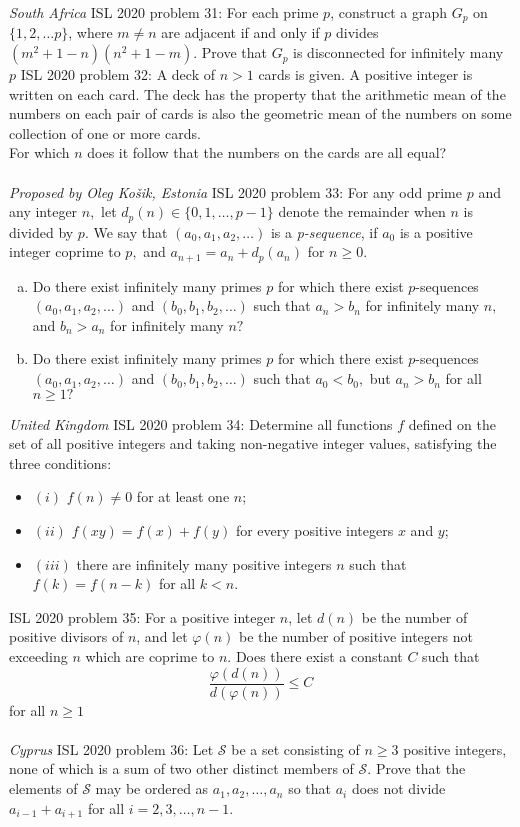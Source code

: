 \textit{South Africa } 
ISL 2020 problem 31:  For each prime $p$, construct a graph $G_p$ on $\{1,2,\ldots p\}$, where $m\neq n$ are adjacent if and only if $p$ divides $(m^2 + 1-n)(n^2 + 1-m)$. Prove that $G_p$ is disconnected for infinitely many $p$ 
ISL 2020 problem 32:  A deck of $n > 1$ cards is given. A positive integer is written on each card. The deck has the property that the arithmetic mean of the numbers on each pair of cards is also the geometric mean of the numbers on some collection of one or more cards. \\
For which $n$ does it follow that the numbers on the cards are all equal? \\\\
\textit{Proposed by Oleg Košik, Estonia} 
ISL 2020 problem 33:  For any odd prime $p$ and any integer $n,$ let $d_p (n) \in \{ 0,1, \dots, p-1 \}$ denote the remainder when $n$ is divided by $p.$ We say that $(a_0, a_1, a_2, \dots)$ is a \textit{p-sequence}, if $a_0$ is a positive integer coprime to $p,$ and $a_{n+1} =a_n + d_p (a_n)$ for $n \geqslant 0.$
\begin{enumerate}[(a)]
  \item Do there exist infinitely many primes $p$ for which there exist $p$-sequences $(a_0, a_1, a_2, \dots)$ and $(b_0, b_1, b_2, \dots)$ such that $a_n >b_n$ for infinitely many $n,$ and $b_n > a_n$ for infinitely many $n?$
  \item Do there exist infinitely many primes $p$ for which there exist $p$-sequences $(a_0, a_1, a_2, \dots)$ and $(b_0, b_1, b_2, \dots)$ such that $a_0 <b_0,$ but $a_n >b_n$ for all $n \geqslant 1?$
\end{enumerate}
\textit{United Kingdom} 
ISL 2020 problem 34:  Determine all functions $f$ defined on the set of all positive integers and taking non-negative integer values, satisfying the three conditions:
\begin{itemize}
  \item $(i)$ $f(n) \neq 0$ for at least one $n$;
  \item $(ii)$ $f(x y)=f(x)+f(y)$ for every positive integers $x$ and $y$;
  \item $(iii)$ there are infinitely many positive integers $n$ such that $f(k)=f(n-k)$ for all $k<n$.
\end{itemize} 
ISL 2020 problem 35:  For a positive integer $n$, let $d(n)$ be the number of positive divisors of $n$, and let $\varphi(n)$ be the number of positive integers not exceeding $n$ which are coprime to $n$. Does there exist a constant $C$ such that
\[ \frac {\varphi ( d(n))}{d(\varphi(n))}\le C \]
for all $n\ge 1$ \\\\
\textit{Cyprus} 
ISL 2020 problem 36:  Let $\mathcal{S}$ be a set consisting of $n \ge 3$ positive integers, none of which is a sum of two other distinct members of $\mathcal{S}$. Prove that the elements of $\mathcal{S}$ may be ordered as $a_1, a_2, \dots, a_n$ so that $a_i$ does not divide $a_{i - 1} + a_{i + 1}$ for all $i = 2, 3, \dots, n - 1$. 

